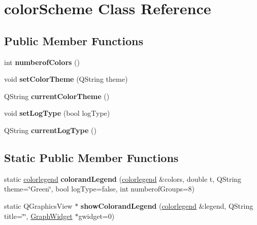 \hypertarget{classcolor_scheme}{}\section{color\+Scheme Class Reference}
\label{classcolor_scheme}
\subsection*{Public Member Functions}
\begin{DoxyCompactItemize}
\item 
\mbox{\label{classcolor_scheme_a5b486afdb5c0d53a5814d517211684f9}} 
int {\bfseries numberof\+Colors} ()
\item 
\mbox{\label{classcolor_scheme_a0040bf4501c58eaa80daabf0d90d0ffd}} 
void {\bfseries set\+Color\+Theme} (Q\+String theme)
\item 
\mbox{\label{classcolor_scheme_a4bc76bef012fd07e15dd25bda6b21ebf}} 
Q\+String {\bfseries current\+Color\+Theme} ()
\item 
\mbox{\label{classcolor_scheme_aa39de59cdc2a3b86b7af14264e71553f}} 
void {\bfseries set\+Log\+Type} (bool log\+Type)
\item 
\mbox{\label{classcolor_scheme_a60e2baa5cbfd36408a29bd5152e79b95}} 
Q\+String {\bfseries current\+Log\+Type} ()
\end{DoxyCompactItemize}
\subsection*{Static Public Member Functions}
\begin{DoxyCompactItemize}
\item 
\mbox{\label{classcolor_scheme_a7ad306be53de5156e1e348e8d88d5742}} 
static \hyperlink{structcolorlegend}{colorlegend} {\bfseries colorand\+Legend} (\hyperlink{structcolorlegend}{colorlegend} \&colors, double t, Q\+String theme=\char`\"{}Green\char`\"{}, bool log\+Type=false, int numberof\+Groups=8)
\item 
\mbox{\label{classcolor_scheme_ab4d8b772d4a04cc74592e7038d063b68}} 
static Q\+Graphics\+View $\ast$ {\bfseries show\+Colorand\+Legend} (\hyperlink{structcolorlegend}{colorlegend} \&legend, Q\+String title=\char`\"{}\char`\"{}, \hyperlink{class_graph_widget}{Graph\+Widget} $\ast$gwidget=0)
\end{DoxyCompactItemize}

